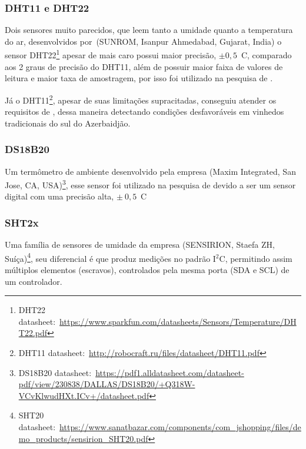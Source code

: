 \documentclass[
article,			%
12pt,				%
oneside,			%
a4paper,			%
english,			%
brazil,				%
sumario=tradicional
]{abntex2}
\begin{document}


\subsubsection{DHT11 e DHT22}\label{DHT11 e DHT22}
Dois sensores muito parecidos, que leem tanto a umidade quanto a temperatura do ar, desenvolvidos por~(SUNROM, Isanpur Ahmedabad, Gujarat, India) o sensor DHT22\footnote{DHT22 datasheet:~\url{https://www.sparkfun.com/datasheets/Sensors/Temperature/DHT22.pdf}} apesar de mais caro possui maior precisão, $\pm 0,5$\textdegree~C, comparado aos 2 graus de precisão do DHT11, além de possuir maior faixa de valores de leitura e maior taxa de amostragem, por isso foi utilizado na pesquisa de \citeauthor{7}.

Já o DHT11\footnote{DHT11 datasheet:~\url{http://robocraft.ru/files/datasheet/DHT11.pdf}}, apesar de suas limitações supracitadas, conseguiu atender os requisitos de \citeauthor{13}, dessa maneira detectando condições desfavoráveis em vinhedos tradicionais do sul do Azerbaidjão.

\subsubsection{DS18B20}\label{DS18B20}
Um termômetro de ambiente desenvolvido pela empresa (Maxim Integrated, San Jose, CA, USA)\footnote{DS18B20 datasheet:~\url{https://pdf1.alldatasheet.com/datasheet-pdf/view/230838/DALLAS/DS18B20/+Q318W-VCvKlwudHXt.ICv+/datasheet.pdf}}, esse sensor foi utilizado na pesquisa de \citeauthor{9} devido a ser um sensor digital com uma precisão alta, $\pm~0,5$\textdegree~C

\subsubsection{SHT2x}\label{SHT2x}
Uma família de sensores de umidade da empresa (SENSIRION, Staefa ZH, Suíça)\footnote{SHT20 datasheet:~\url{https://www.sanatbazar.com/components/com_jshopping/files/demo_products/sensirion_SHT20.pdf}}, seu diferencial é que produz medições no padrão I$^2$C, permitindo assim múltiplos elementos (escravos), controlados pela mesma porta (SDA e SCL) de um controlador.
\end{document}
